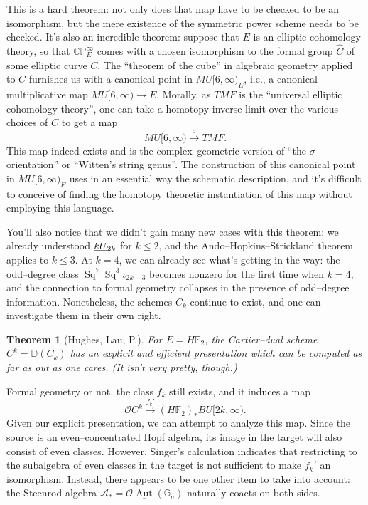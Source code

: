\documentclass{amsart}
\newcommand{\F}{\mathbb F}
\newcommand{\G}{\mathbb G}
\newcommand{\C}{\mathbb{C}}
\newcommand{\CP}{\C\P}
\renewcommand{\P}{\mathbb{P}}
\newcommand{\<}{\langle}
\renewcommand{\>}{\rangle}
\newcommand{\OS}[2]{\smash{\underline{#1}}_{#2}}
\newcommand{\TMF}{\mathit{TMF}}
\DeclareMathOperator{\Sq}{Sq}
\theoremstyle{plain}
\newtheorem*{theorem}{Theorem}
\theoremstyle{definition}
\theoremstyle{remark}
\begin{document}
This is a hard theorem: not only does that map have to be checked to be an isomorphism, but the mere existence of the symmetric power scheme needs to be checked.  It's also an incredible theorem: suppose that $E$ is an elliptic cohomology theory, so that $\CP^\infty_E$ comes with a chosen isomorphism to the formal group $\widehat{C}$ of some elliptic curve $C$.    The ``theorem of the cube'' in algebraic geometry applied to $C$ furnishes us with a canonical point in $MU[6, \infty)_E$, i.e., a canonical multiplicative map $MU[6, \infty) \to E$.  Morally, as $\TMF$ is the ``universal elliptic cohomology theory'', one can take a homotopy inverse limit over the various choices of $C$ to get a map \[MU[6, \infty) \xrightarrow{\sigma} \TMF.\]  This map indeed exists and is the complex--geometric version of ``the $\sigma$--orientation'' or ``Witten's string genus''.  The construction of this canonical point in $MU[6, \infty)_E$ uses in an essential way the schematic description, and it's difficult to conceive of finding the homotopy theoretic instantiation of this map without employing this language.

You'll also notice that we didn't gain many new cases with this theorem: we already understood $\OS{kU}{2k}$ for $k \le 2$, and the Ando--Hopkins--Strickland theorem applies to $k \le 3$.  At $k = 4$, we can already see what's getting in the way: the odd--degree class $\Sq^7 \Sq^3 \iota_{2k-3}$ becomes nonzero for the first time when $k = 4$, and the connection to formal geometry collapses in the presence of odd--degree information.  Nonetheless, the schemes $C_k$ continue to exist, and one can investigate them in their own right.

\begin{theorem}[Hughes, Lau, P.]
For $E = H\F_2$, the Cartier--dual scheme $C^k = \mathbb{D}(C_k)$ has an explicit and efficient presentation which can be computed as far as out as one cares.  (It isn't very pretty, though.)
\end{theorem}

Formal geometry or not, the class $f_k$ still exists, and it induces a map \[\mathcal{O} C^k \xrightarrow{f_k'} (H\F_2)_* BU[2k, \infty).\]  Given our explicit presentation, we can attempt to analyze this map.  Since the source is an even--concentrated Hopf algebra, its image in the target will also consist of even classes.  However, Singer's calculation indicates that restricting to the subalgebra of even classes in the target is not sufficient to make $f_k'$ an isomorphism.  Instead, there appears to be one other item to take into account: the Steenrod algebra $\mathcal{A}_* = \mathcal{O} \underline{\operatorname{Aut}}(\G_a)$ naturally coacts on both sides.
\end{document}
